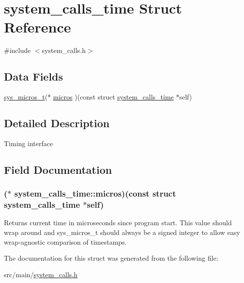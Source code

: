 \hypertarget{structsystem__calls__time}{\section{system\+\_\+calls\+\_\+time Struct Reference}
\label{structsystem__calls__time}
}


{\ttfamily \#include $<$system\+\_\+calls.\+h$>$}

\subsection*{Data Fields}
\begin{DoxyCompactItemize}
\item 
\hyperlink{system__calls_8h_a1374d627d8a03b6d9ebb6707c67cf2ff}{sys\+\_\+micros\+\_\+t}($\ast$ \hyperlink{structsystem__calls__time_ab5849ec39c447240b9891f5a691a31e9}{micros} )(const struct \hyperlink{structsystem__calls__time}{system\+\_\+calls\+\_\+time} $\ast$self)
\end{DoxyCompactItemize}


\subsection{Detailed Description}
Timing interface 

\subsection{Field Documentation}
\hypertarget{structsystem__calls__time_ab5849ec39c447240b9891f5a691a31e9}{
\subsubsection[{micros}]{($\ast$ system\+\_\+calls\+\_\+time\+::micros)(const struct {\bf system\+\_\+calls\+\_\+time} $\ast$self)}}\label{structsystem__calls__time_ab5849ec39c447240b9891f5a691a31e9}
Returns current time in microseconds since program start. This value should wrap around and sys\+\_\+micros\+\_\+t should always be a signed integer to allow easy wrap-\/agnostic comparison of timestamps. 

The documentation for this struct was generated from the following file\+:\begin{DoxyCompactItemize}
\item 
src/main/\hyperlink{system__calls_8h}{system\+\_\+calls.\+h}\end{DoxyCompactItemize}
